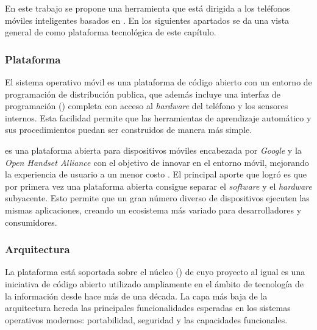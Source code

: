 En este trabajo se propone una herramienta que está dirigida a los
teléfonos móviles inteligentes basados en . En los
siguientes apartados se da una vista general de  como
plataforma tecnológica de este capítulo.

\subsubsection{Plataforma}

El sistema operativo móvil  es una plataforma de código
abierto con un entorno de programación de distribución publica, que
además incluye una interfaz de programación () completa
con acceso al \emph{hardware} del teléfono y los sensores internos.
Esta facilidad permite que las herramientas de aprendizaje automático
y sus procedimientos puedan ser construidos de manera más simple. 

 es una plataforma abierta para dispositivos móviles
encabezada por \emph{Google} y la \emph{Open Handset Alliance \cite{OHA2008}}
con el objetivo de innovar en el entorno móvil, mejorando la experiencia
de usuario a un menor costo \cite{Gargenta2014}. El principal aporte
que logró  es que por primera vez una plataforma abierta
consigue separar el \emph{software} y el \emph{hardware} subyacente.
Esto permite que un gran número diverso de dispositivos ejecuten las
mismas aplicaciones, creando un ecosistema más variado para desarrolladores
y consumidores. 

\subsubsection{Arquitectura}

La plataforma  está soportada sobre el núcleo ()
de  cuyo proyecto al igual es una iniciativa de código
abierto utilizado ampliamente en el ámbito de tecnología de la información
desde hace más de una década. La capa más baja de la arquitectura
hereda las principales funcionalidades esperadas en los sistemas operativos
modernos: portabilidad, seguridad y las capacidades funcionales.

